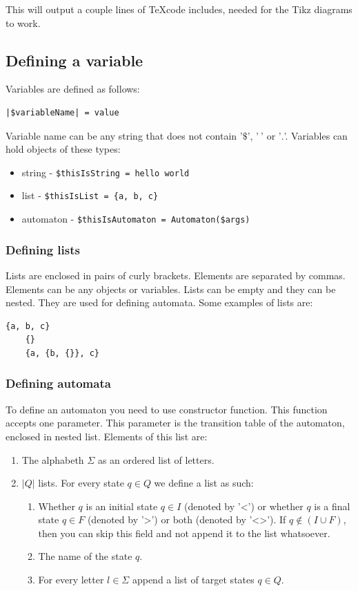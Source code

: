 \documentclass{ctuthesis}
\begin{document}
This will output a couple lines of \TeX code includes, needed for the Tikz diagrams to work.

\subsection{Defining a variable}
Variables are defined as follows:
\begin{lstlisting}[language = JASL_snippet]
	|$variableName| = value
\end{lstlisting}

Variable name can be any string that does not contain '$\$$', '$\ $' or '$.$'. Variables can hold objects of these types:
\begin{itemize}
	\item string - \verb'$thisIsString = hello world'
	\item list - \verb'$thisIsList = {a, b, c}'
	\item automaton - \verb'$thisIsAutomaton = Automaton($args)'
\end{itemize}

\subsubsection{Defining lists}
Lists are enclosed in pairs of curly brackets. Elements are separated by commas. Elements can be any objects or variables. Lists can be empty and they can be nested. They are used for defining automata. Some examples of lists are:

\begin{minipage}{\linewidth}
\begin{lstlisting}[language = JASL_snippet]
	{a, b, c}
	{}
	{a, {b, {}}, c}
\end{lstlisting}
\end{minipage}

\subsubsection{Defining automata}
To define an automaton you need to use constructor function. This function accepts one parameter. This parameter is the transition table of the automaton, enclosed in nested list. Elements of this list are:

\begin{enumerate}
	\item The alphabeth $\Sigma$ as an ordered list of letters.
	\item $|Q|$ lists. For every state $q \in Q$ we define a list as such:
		\begin{enumerate}
			\item Whether $q$ is an initial state $q \in I$ (denoted by '<') or whether $q$ is a final state $q \in F$ (denoted by '>') or both (denoted by '<>'). If $q \not \in (I \cup F)$, then you can skip this field and not append it to the list whatsoever.
			\item The name of the state $q$.
			\item For every letter $l \in \Sigma$ append a list of target states $q \in Q$.
		\end{enumerate}
\end{enumerate}
\end{document}
